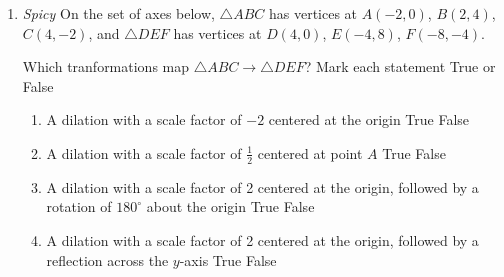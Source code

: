 \documentclass[12pt, twoside]{article}
\begin{document}
\begin{enumerate}
      \item \emph{Spicy} On the set of axes below, $\triangle ABC$ has vertices at $A(-2,0)$, $B(2,4)$, $C(4,-2)$, and $\triangle DEF$ has vertices at $D(4,0)$, $E(-4,8)$, $F(-8,-4)$.
        \begin{center}
        \end{center}
        Which tranformations map $\triangle ABC \rightarrow \triangle DEF$? Mark each statement True or False
          \begin{enumerate}
            \item A dilation with a scale factor of $-2$ centered at the origin \hfill True \quad False
            \item A dilation with a scale factor of $\frac{1}{2}$ centered at point $A$ \hfill True \quad False
            \item A dilation with a scale factor of 2 centered at the origin, followed by a rotation of $180^\circ$ about the origin \hfill True \quad False
            \item A dilation with a scale factor of 2 centered at the origin, followed by a reflection across the $y$-axis \hfill True \quad False
          \end{enumerate}

  \end{enumerate}

  
\end{document}
